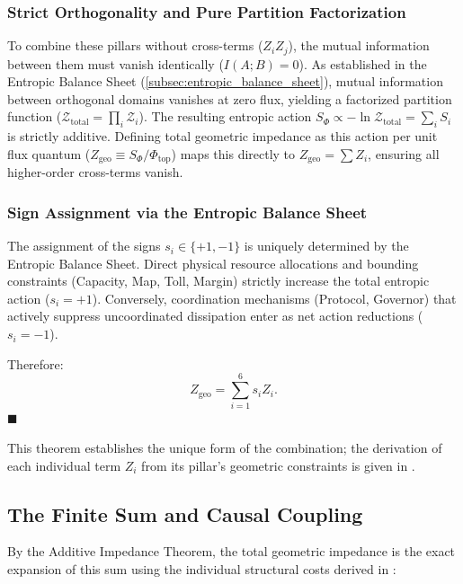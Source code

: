 \subsubsection{Strict Orthogonality and Pure Partition Factorization}
To combine these pillars without cross-terms ($Z_i Z_j$), the mutual information between them must vanish identically ($I(A;B)=0$). As established in the Entropic Balance Sheet (\cref{subsec:entropic_balance_sheet}), mutual information between orthogonal domains vanishes at zero flux, yielding a factorized partition function ($\mathcal{Z}_{\mathrm{total}} = \prod_i \mathcal{Z}_i$). The resulting entropic action $S_\Phi \propto -\ln \mathcal{Z}_{\mathrm{total}} = \sum_i S_i$ is strictly additive. Defining total geometric impedance as this action per unit flux quantum ($Z_{\mathrm{geo}} \equiv S_\Phi / \Phi_{\mathrm{top}}$) maps this directly to $Z_{\mathrm{geo}} = \sum Z_i$, ensuring all higher-order cross-terms vanish.

\subsubsection{Sign Assignment via the Entropic Balance Sheet}
The assignment of the signs $s_i \in \{+1, -1\}$ is uniquely determined by the Entropic Balance Sheet. Direct physical resource allocations and bounding constraints (Capacity, Map, Toll, Margin) strictly increase the total entropic action ($s_i = +1$). Conversely, coordination mechanisms (Protocol, Governor) that actively suppress uncoordinated dissipation enter as net action reductions ($s_i = -1$). 

\vspace{1em}
Therefore:
\begin{equation}
    Z_{\mathrm{geo}} = \sum_{i=1}^6 s_i Z_i .
\end{equation}
\hfill $\blacksquare$

This theorem establishes the unique form of the combination; the derivation of each individual term $Z_i$ from its pillar's geometric constraints is given in .


\subsection{The Finite Sum and Causal Coupling}
\label{subsec:finite_sum_numerical}

By the Additive Impedance Theorem, the total geometric impedance is the exact expansion of this sum using the individual structural costs derived in :

